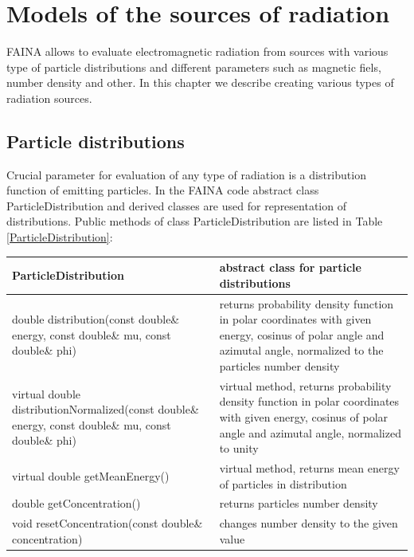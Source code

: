 \chapter{Models of the sources of radiation}\label{radiation}
FAINA allows to evaluate electromagnetic radiation from sources with various type of particle distributions and different parameters such as magnetic fiels, number density and other. In this chapter we describe creating various types of radiation sources.

\section{Particle distributions}

Crucial parameter for evaluation of any type of radiation is a distribution function of emitting particles. In the FAINA code abstract class ParticleDistribution and derived classes are used for representation of distributions. Public methods of class ParticleDistribution are listed in Table \ref{ParticleDistribution}:

\begin{small}
		\label{ParticleDistribution}
		
		\begin{xtabular}{|p{0.45\textwidth}|p{0.55\textwidth}|}
			\hline
			\textbf{ParticleDistribution} & abstract class for particle distributions\\
			\hline
			double distribution(const double\& energy, const double\& mu, const double\& phi) & returns probability density function in polar coordinates with given energy, cosinus of polar angle and azimutal angle, normalized to the particles number density \\
			\hline
			virtual double distributionNormalized(const double\& energy, const double\& mu, const double\& phi) & virtual method, returns probability density function in polar coordinates with given energy, cosinus of polar angle and azimutal angle, normalized to unity\\
			\hline
			virtual double getMeanEnergy() & virtual method, returns mean energy of particles in distribution\\
			\hline
			double getConcentration() & returns particles number density\\
			\hline
			void resetConcentration(const double\& concentration) & changes number density to the given value\\
			\hline
		\end{xtabular}
\end{small}

